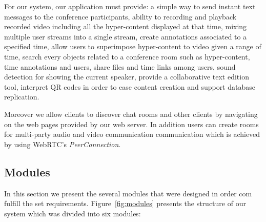 \documentclass[10pt,conference]{IEEEtran}
\begin{document}

For our system, our application must provide: a simple way to send instant text messages to the conference participants, ability to recording and playback recorded video including all the hyper-content displayed at that time, mixing multiple user streams into a single stream, create annotations associated to a specified time, allow users to superimpose hyper-content to video given a range of time, search every objects related to a conference room such as hyper-content, time annotations and users, share files and time links among users, sound detection for showing the current speaker, provide a collaborative text edition tool, interpret \gls{QR} codes in order to ease content creation and support database replication.

	Moreover we allow clients to discover chat rooms and other clients by navigating on the web pages provided by our web server. In addition users can create rooms for multi-party audio and video communication communication which is achieved by using \gls{WebRTC}'s \emph{PeerConnection}.
        
\subsection{Modules}
In this section we present the several modules that were designed in order com fulfill the set requirements.
	Figure~\ref{fig:modules} presents the structure of our system which was divided into six modules:
\end{document}
